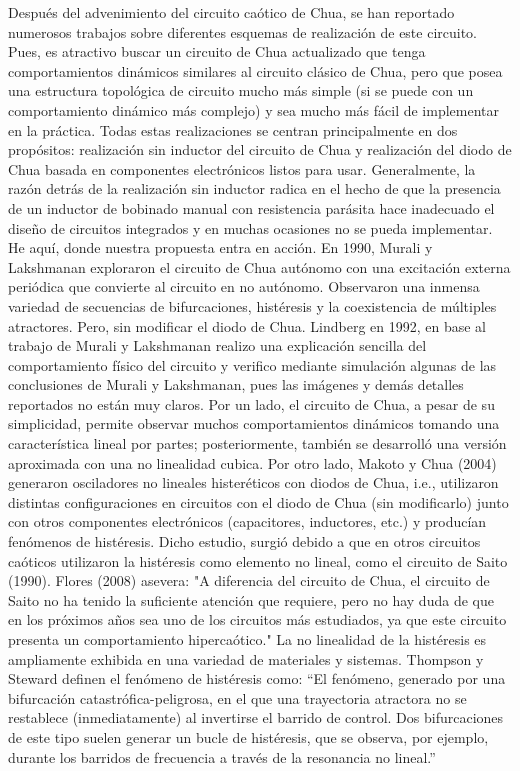 \documentclass{rbf}
\begin{document}
Después del advenimiento del circuito caótico de Chua, se han reportado numerosos trabajos sobre diferentes esquemas de realización de este circuito. Pues, es atractivo buscar un circuito de Chua actualizado que tenga comportamientos dinámicos similares al circuito clásico de Chua, pero que posea una estructura topológica de circuito mucho más simple (si se puede con un comportamiento dinámico más complejo) y sea mucho más fácil de implementar en la práctica. Todas estas realizaciones se centran principalmente en dos propósitos: realización sin inductor del circuito de Chua y realización del diodo de Chua basada en componentes electrónicos listos para usar. Generalmente, la razón detrás de la realización sin inductor radica en el hecho de que la presencia de un inductor de bobinado manual con resistencia parásita hace inadecuado el diseño de circuitos integrados y en muchas ocasiones no se pueda implementar. He aquí, donde nuestra propuesta entra en acción.
En 1990, Murali y Lakshmanan exploraron el circuito de Chua autónomo con una excitación externa periódica que convierte al circuito en no autónomo. Observaron una inmensa variedad de secuencias de bifurcaciones, histéresis y la coexistencia de múltiples atractores. Pero, sin modificar el diodo de Chua. Lindberg en 1992, en base al trabajo de Murali y Lakshmanan realizo una explicación sencilla del comportamiento físico del circuito y verifico mediante simulación algunas de las conclusiones de Murali y Lakshmanan, pues las imágenes y demás detalles reportados no están muy claros.
Por un lado, el circuito de Chua, a pesar de su simplicidad, permite observar muchos comportamientos dinámicos tomando una característica lineal por partes; posteriormente, también se desarrolló una versión aproximada con una no linealidad cubica.
Por otro lado, Makoto y Chua (2004) generaron osciladores no lineales histeréticos con diodos de Chua, i.e., utilizaron distintas configuraciones en circuitos con el diodo de Chua (sin modificarlo) junto con otros componentes electrónicos (capacitores, inductores, etc.) y producían fenómenos de histéresis. Dicho estudio, surgió debido a que en otros circuitos caóticos utilizaron la histéresis como elemento no lineal, como el circuito de Saito (1990). Flores (2008) asevera: "A diferencia del circuito de Chua, el circuito de Saito no ha tenido la suficiente atención que requiere, pero no hay duda de que en los próximos años sea uno de los circuitos más estudiados, ya que este circuito presenta un comportamiento hipercaótico."
La no linealidad de la histéresis es ampliamente exhibida en una variedad de materiales y sistemas. Thompson y Steward definen el fenómeno de histéresis como:
“El fenómeno, generado por una bifurcación catastrófica-peligrosa, en el que una trayectoria atractora no se restablece (inmediatamente) al invertirse el barrido de control. Dos bifurcaciones de este tipo suelen generar un bucle de histéresis, que se observa, por ejemplo, durante los barridos de frecuencia a través de la resonancia no lineal.”
\end{document}
